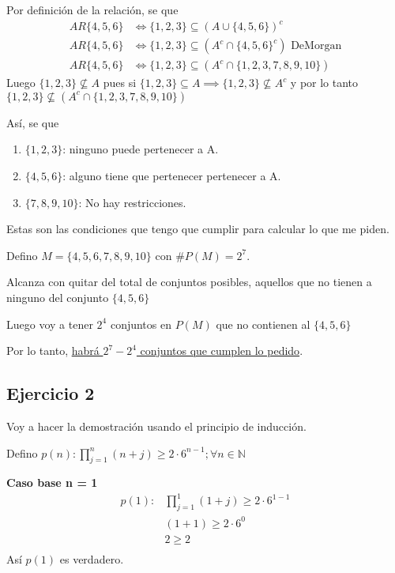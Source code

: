 Por definición de la relación, se que
\begin{align*}
    AR\{ 4,5,6 \} &\iff \{ 1,2,3 \} \subseteq (A\cup \{ 4,5,6 \})^c \\
    AR\{ 4,5,6 \} &\iff \{ 1,2,3 \} \subseteq (A^c\cap \{ 4,5,6 \}^c) \text{ DeMorgan} \\
    AR\{ 4,5,6 \} &\iff \{ 1,2,3 \} \subseteq (A^c\cap \{ 1,2,3,7,8,9,10 \})
\end{align*}
Luego $ \{ 1,2,3 \} \not \subseteq A $ pues si $ \{ 1,2,3 \} \subseteq A \implies \{ 1,2,3 \} \not \subseteq A^c $ y por lo tanto
$ \{ 1,2,3 \} \not \subseteq (A^c \cap \{ 1,2,3,7,8,9,10 \}) $

Así, se que
\begin{enumerate}
    \item $ \{ 1,2,3 \} $: ninguno puede pertenecer a A.
    \item $ \{ 4,5,6 \} $: alguno tiene que pertenecer pertenecer a A.
    \item $ \{ 7,8,9,10 \} $: No hay restricciones.
\end{enumerate}

Estas son las condiciones que tengo que cumplir para calcular lo que me piden.

Defino $ M = \{ 4,5,6,7,8,9,10 \} $ con $ \#P(M) = 2^7 $.

Alcanza con quitar del total de conjuntos posibles, aquellos que no tienen a ninguno del conjunto $ \{ 4,5,6 \} $

Luego voy a tener $ 2^4 $ conjuntos en $ P(M) $ que no contienen al $ \{ 4,5,6 \} $

Por lo tanto, \underline{habrá $ 2^7 - 2^4 $ conjuntos que cumplen lo pedido}.

\subsection{Ejercicio 2}

Voy a hacer la demostración usando el principio de inducción.

Defino $ p(n): \prod_{j=1}^{n}(n+j) \geq 2 \cdot 6^{n-1}; \forall n \in \mathbb{N} $

\textbf{Caso base n = 1}
\begin{align*}
    p(1): & \prod_{j=1}^{1}(1+j) \geq 2 \cdot 6^{1-1} \\
    & (1+1) \geq 2 \cdot 6^0 \\
    & 2 \geq 2 \\
\end{align*}
Así $ p(1) $ es verdadero.

